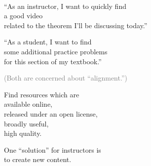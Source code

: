 \documentclass{chalkboard}
\begin{document}
\begin{frame}[nofills]
\vfill

 \\[24pt]

\vfill
\end{frame}

\begin{frame}
  \huge 

  ``As an instructor, I want to quickly find \\
  \quad a good video \\
  \quad\quad related to the theorem I'll be discussing today.''

  \vfill

  ``As a student, I want to find \\
  \quad some additional practice problems \\
  \quad\quad for this section of my textbook.''

  \vfill
  
  \textcolor{gray}{(Both are concerned about ``alignment.'')}
\end{frame}

\begin{frame}
  \huge

  Find resources which are \\
  \quad available online, \\
  \quad released under an open license, \\
  \quad broadly useful, \\
  \quad high quality.

  \vfill

  One ``solution'' for instructors is \\
  \quad to create new content.

\end{frame}


\begin{frame}[nofills]
\vfill

 \\[24pt]

\begin{center}\end{center}


\vfill

\end{frame}
\end{document}
